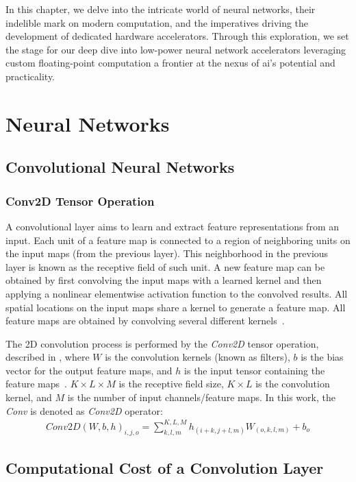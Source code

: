In this chapter, we delve into the intricate world of neural networks, their indelible mark on modern computation, and the imperatives driving the development of dedicated hardware accelerators. Through this exploration, we set the stage for our deep dive into low-power neural network accelerators leveraging custom floating-point computation a frontier at the nexus of \gls{ai}'s potential and practicality.

\section{Neural Networks}

\subsection{Convolutional Neural Networks}
\subsubsection{Conv2D Tensor Operation}
A convolutional layer aims to learn and extract feature representations from an input. Each unit of a feature map is connected to a region of neighboring units on the input maps (from the previous layer). This neighborhood in the previous layer is known as the receptive field of such unit. A new feature map can be obtained by first convolving the input maps with a learned kernel and then applying a nonlinear elementwise activation function to the convolved results. All spatial locations on the input maps share a kernel to generate a feature map. All feature maps are obtained by convolving several different kernels~\cite{gu2018recent}.


The 2D convolution process is performed by the \emph{Conv2D} tensor operation, described in , where $W$ is the convolution kernels (known as filters), $b$ is the bias vector for the output feature maps, and $h$ is the input tensor containing the feature maps~\cite{goodfellow2016deep}. $K\times L\times M$ is the receptive field size, $K\times L$ is the convolution kernel, and $M$ is the number of input channels/feature maps. In this work, the \emph{Conv} is denoted as \emph{Conv2D} operator:
\begin{eqnarray} \label{eq:conv2D}
Conv2D\left(W,b,h\right)_{i,j,o}=\sum_{k,l,m}^{K,L,M} h_{(i+k,j+l,m)} W_{(o,k,l,m)}+b_{o}
\end{eqnarray}

\subsection{Computational Cost of a Convolution Layer}

